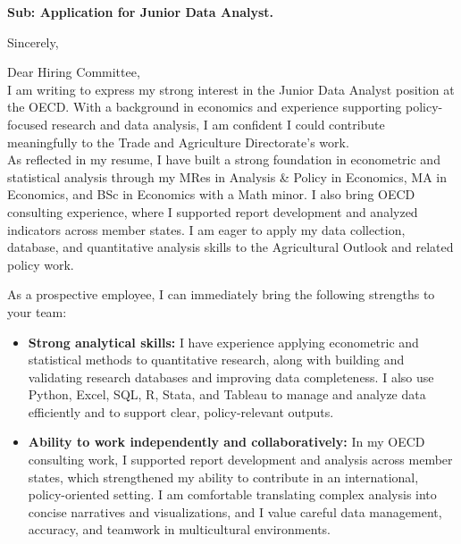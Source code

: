 \documentclass[11pt,a4paper,roman]{moderncv}
\begin{document}
\date{\today}
\opening{\textbf{Sub: Application for Junior Data Analyst.}}
\closing{Sincerely, \vspace{-1em}}


\makelettertitle



Dear Hiring Committee,
\\
\vspace{1em}
I am writing to express my strong interest in the Junior Data Analyst position at the OECD. With a background in economics and experience supporting policy-focused research and data analysis, I am confident I could contribute meaningfully to the Trade and Agriculture Directorate's work.\\

\vspace{1em}
As reflected in my resume, I have built a strong foundation in econometric and statistical analysis through my MRes in Analysis \& Policy in Economics, MA in Economics, and BSc in Economics with a Math minor. I also bring OECD consulting experience, where I supported report development and analyzed indicators across member states. I am eager to apply my data collection, database, and quantitative analysis skills to the Agricultural Outlook and related policy work.\\
\vspace{1em}

As a prospective employee, I can immediately bring the following strengths to your team:
\vspace{0.5em}
\begin{itemize}
\item \textbf{Strong analytical skills:} I have experience applying econometric and statistical methods to quantitative research, along with building and validating research databases and improving data completeness. I also use Python, Excel, SQL, R, Stata, and Tableau to manage and analyze data efficiently and to support clear, policy-relevant outputs.
\item \textbf{Ability to work independently and collaboratively:} In my OECD consulting work, I supported report development and analysis across member states, which strengthened my ability to contribute in an international, policy-oriented setting. I am comfortable translating complex analysis into concise narratives and visualizations, and I value careful data management, accuracy, and teamwork in multicultural environments.
\end{itemize}
\end{document}
